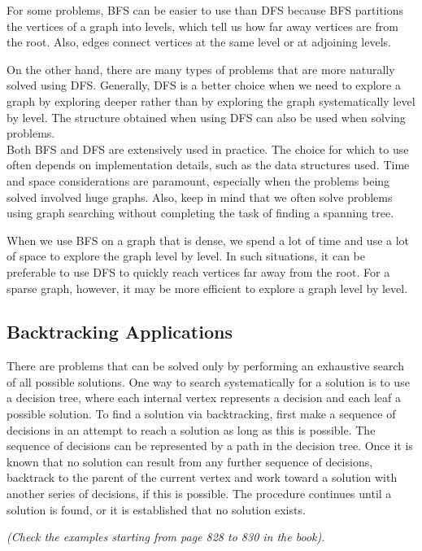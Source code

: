 \documentclass{article}
\begin{document}
For some problems, BFS can be easier to use than DFS because BFS partitions the vertices of a graph into levels, which tell us how far away vertices are from the root. Also, edges connect vertices at the same level or at adjoining levels.

On the other hand, there are many types of problems that are more naturally solved using DFS. Generally, DFS is a better choice when we need to explore a graph by exploring deeper rather than by exploring the graph systematically level by level. The structure obtained when using DFS can also be used when solving problems.\\

Both BFS and DFS are extensively used in practice. The choice for which to use often depends on implementation details, such as the data structures used. Time and space considerations are paramount, especially when the problems being solved involved huge graphs. Also, keep in mind that we often solve problems using graph searching without completing the task of finding a spanning tree. 

When we use BFS on a graph that is dense, we spend a lot of time and use a lot of space to explore the graph level by level. In such situations, it can be preferable to use DFS to quickly reach vertices far away from the root. For a sparse graph, however, it may be more efficient to explore a graph level by level.

\subsection{Backtracking Applications}

There are problems that can be solved only by performing an exhaustive search of all possible solutions. One way to search systematically for a solution is to use a decision tree, where each internal vertex represents a decision and each leaf a possible solution. To find a solution via backtracking, first make a sequence of decisions in an attempt to reach a solution as long as this is possible. The sequence of decisions can be represented by a path in the decision tree. Once it is known that no solution can result from any further sequence of decisions, backtrack to the parent of the current vertex and work toward a solution with another series of decisions, if this is possible. The procedure continues until a solution is found, or it is established that no solution exists.

\textit{(Check the examples starting from page 828 to 830 in the book)}.
\end{document}
